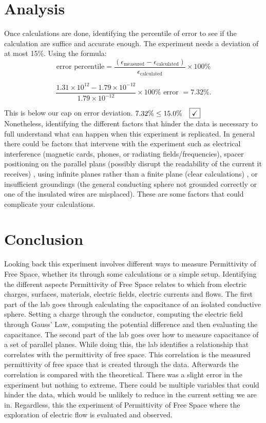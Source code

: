 \documentclass{article}
\begin{document}
\section*{Analysis}
Once calculations are done, identifying the percentile of error to see if the calculation are suffice and accurate enough. The experiment needs a deviation of at most 15\%. Using the formula:
$$ \text{error percentile} = \frac{ ( \epsilon_{\text{measured}}-  \epsilon_{\text{calculated}} )}{\epsilon_{\text{calculated}}} \times 100\% $$

$$ \frac { 1.31\times10^{12} - 1.79\times10^{-12}}{1.79\times10^{-12}} \times 100 \% \text{ error } = 7.32\%.$$

This is below our cap on error deviation. $7.32\% \leq 15.0\%  \quad \fbox{\checkmark}$\\

Nonetheless, identifying the different factors that hinder the data is necessary to full understand what can happen when this experiment is replicated. In general there could be factors that intervene with the experiment such as electrical interference (magnetic cards, phones, or radiating fields/frequencies), spacer positioning on the parallel plans (possibly disrupt the readability of the current it receives) , using infinite planes rather than a finite plane (clear calculations) , or insufficient groundings (the general conducting sphere not grounded correctly or one of the insulated wires are misplaced). These are some factors that could complicate your calculations. 
\section*{Conclusion}
 Looking back this experiment involves different ways to measure Permittivity of Free Space, whether its through some calculations or a simple setup. Identifying the different aspects Permittivity of Free Space relates to which from electric charges, surfaces, materials, electric fields, electric currents and flows. The first part of the lab goes through calculating the capacitance of an isolated conductive sphere. Setting a charge through the conductor, computing the electric field through Gauss' Law, computing the potential difference and then evaluating the capacitance.  The second part of the lab goes over how to measure capacitance of a set of parallel planes. While doing this, the lab identifies a relationship that correlates with the permittivity of free space. This correlation is the measured permittivity of free space that is created through the data. Afterwards the correlation is compared with the theoretical. There was a slight error in the experiment but nothing to extreme. There could be multiple variables that could hinder the data, which would be unlikely to reduce in the current setting we are in. Regardless, this the experiment of Permittivity of Free Space where the exploration of electric flow is evaluated and observed.
\end{document}
